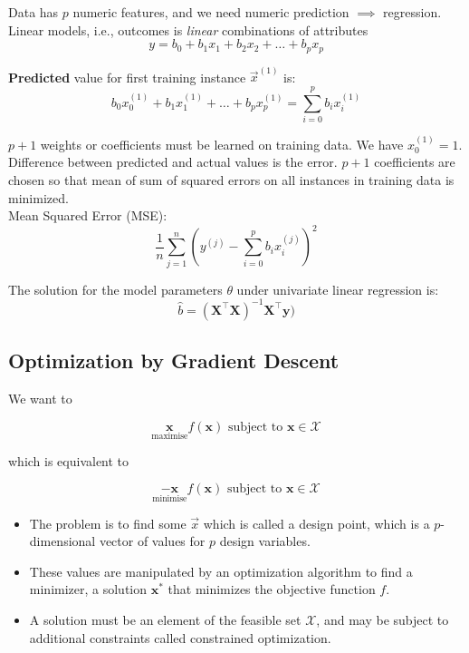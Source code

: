Data has \(p\) numeric features, and we need numeric prediction \(\implies\) regression. \\

Linear models, i.e., outcomes is \textit{linear} combinations of attributes
\[y = b_0 + b_1 x_1 + b_2 x_2 + \dots + b_p x_p\]

\textbf{Predicted} value for first training instance \(\vec{x}^{(1)}\) is:
\[b_0x_0^{(1)} + b_1x_1^{(1)} + \dots + b_px_p^{(1)} = \sum_{i=0}^p b_ix_i^{(1)}\]

\(p + 1\) weights or coefficients must be learned on training data. We have \(x_0^{(1)} = 1\). \\

Difference between predicted and actual values is the error. \(p + 1\) coefficients are chosen so that mean of sum of squared errors on all instances in training data is minimized. \\

Mean Squared Error (MSE):
\[\frac{1}{n} \sum_{j = 1}^n \left(y^{(j)} - \sum_{i = 0}^p b_ix_i^{(j)}\right)^2\]

The solution for the model parameters \(\theta\) under univariate linear regression is:
\[\hat{b} = (\mathbf{X}^\top \mathbf{X})^{-1}\mathbf{X}^\top \mathbf{y})\]

\subsection{Optimization by Gradient Descent}

We want to

\[\underset{\text{maximise}}{\mathbf{x}} f(\mathbf{x}) \text{ subject to } \mathbf{x} \in \mathcal{X} \]

which is equivalent to

\[\underset{\text{minimise}}{-\mathbf{x}} f(\mathbf{x}) \text{ subject to } \mathbf{x} \in \mathcal{X} \]

\begin{itemize}
    \item The problem is to find some \(\vec{x}\) which is called a design point, which is a \(p\)-dimensional vector of values for \(p\) design variables.
    \item These values are manipulated by an optimization algorithm to find a minimizer, a solution \(\mathbf{x}^*\) that minimizes the objective function \(f\).
    \item A solution must be an element of the feasible set \(\mathcal{X}\), and may be subject to additional constraints called constrained optimization.
\end{itemize}


